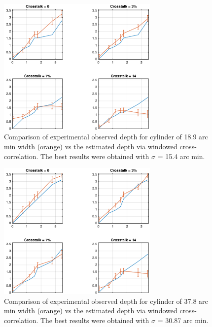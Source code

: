 \begin{figure}[H]
\centering
    \includegraphics[width=0.7\textwidth]{./Template_Figures/s_9_sigma_7_4}
    \caption{Comparison of experimental observed depth for cylinder of 18.9 arc min width (orange) vs the estimated depth via windowed cross-correlation. The best results were obtained with $\sigma$ = 15.4 arc min.\label{fig:s_9_sigma_7_4}}
\end{figure}
\begin{figure}[H]
\centering
    \includegraphics[width=0.7\textwidth]{./Template_Figures/s_18_sigma_14_7}
    \caption{Comparison of experimental observed depth for cylinder of 37.8 arc min width (orange) vs the estimated depth via windowed cross-correlation. The best results were obtained with $\sigma$ = 30.87 arc min.\label{fig:s_18_sigma_14_7}}
\end{figure}
